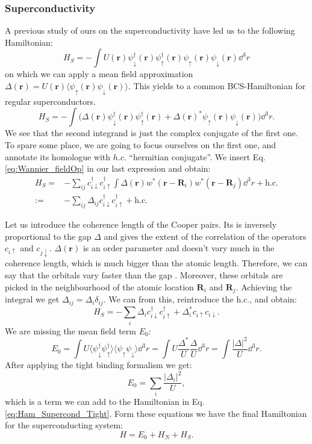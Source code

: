 \documentclass[../main.tex]{subfile}
\begin{document}
\subsubsection{Superconductivity}
A previous study of ours on the superconductivity have led us to the following Hamiltonian:
\begin{equation}\label{eq:Ham_Supercond_Tight}
    H_S = - \int U(\bm{r}) \psi_{\downarrow}^{\dagger}(\bm{r})\psi_{\uparrow}^{\dagger}(\bm{r})\psi_{\uparrow}(\bm{r})\psi_{\downarrow}(\bm{r}) \dd^3r
\end{equation}
on which we can apply a mean field approximation $\Delta(\bm{r}) = U(\bm{r})\langle \psi_{\uparrow}(\bm{r})\psi_{\downarrow}(\bm{r})\rangle$.
This yields to a common BCS-Hamiltonian for regular superconductors.\\
\[
    H_S = - \int \biggl(\Delta(\bm{r}) \psi_{\downarrow}^{\dagger}(\bm{r})\psi_{\uparrow}^{\dagger}(\bm{r}) +
     \Delta(\bm{r})^{\ast}\psi_{\uparrow}(\bm{r})\psi_{\downarrow}(\bm{r})\biggr) \dd^3r.
\]  
We see that the second integrand is just the complex conjugate of the first one. 
To spare some place, we are going to focus ourselves on the first one, and annotate its homologue with $h.c.$ ``hermitian conjugate''. We insert Eq. \ref{eq:Wannier_fieldOp} 
in our last expression and obtain:
\begin{align*}
    H_S =& - \sum_{ij} c_{i\downarrow}^{\dagger}c_{i\uparrow}^{\dagger} \int \Delta(\bm{r}) w^{\ast}(\bm{r} - \bm{R}_i) w^{\ast}(\bm{r} - \bm{R}_j) \dd^3r + \text{h.c.}\\
    :=& -\sum_{ij} \Delta_{ij} c_{i\downarrow}^{\dagger}c_{i\uparrow}^{\dagger} + \text{h.c.}
\end{align*}

Let us introduce the coherence length of the Cooper pairs. Its is inversely proportional to the gap $\Delta$ and gives the extent of the correlation of the operators $c_{i\uparrow}$ and $c_{j\downarrow}$.
$\Delta(\bm{r})$ is an order parameter and doesn't vary much in the coherence length, which is much bigger than the atomic length.
Therefore, we can say that the orbitals vary faster than the gap \cite{Ouassou_unpubl}. Moreover, these orbitals are picked in the neighbourhood of the atomic location $\bm{R}_i$ and $\bm{R}_j$.
Achieving the integral we get $\Delta_{ij} = \Delta_i \delta_{ij}$. We can from this, reintroduce the h.c., and obtain:
\begin{equation}\label{eq:Ham_Superc    ond_Tight}
    H_S = -\sum_{i} \Delta_i c_{i\downarrow}^{\dagger}c_{i\uparrow}^{\dagger} + \Delta_i^{\ast} c_{i\uparrow}c_{i\downarrow}.
\end{equation}
We are missing the mean field term $E_0$:
\[
    E_0 = \int U \langle \psi_{\downarrow}^{\dagger}\psi_{\uparrow}^{\dagger}\rangle \langle\psi_{\uparrow}\psi_{\downarrow}\rangle \dd^3r 
    = \int U \frac{\Delta^{\ast}}{U}\frac{\Delta}{U} \dd^3r = \int \frac{|\Delta|^2}{U} \dd^3r.
\]
After applying the tight binding formalism we get:
\[
    E_0 = \sum_{i} \frac{|\Delta_i|^2}{U},
\]
which is a term we can add to the Hamiltonian in Eq. \ref{eq:Ham_Supercond_Tight}. Form these equations we have the final 
Hamiltonian for the superconducting system:
\[
    H = E_0 + H_N + H_S.
\]  
\end{document}
